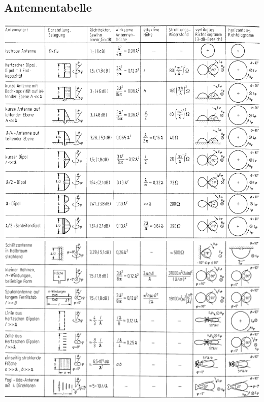 \newpage
\subsection{Antennentabelle}
\begin{minipage}{1.7\columnwidth}
    \includegraphics[width=.55\columnwidth]{Figures/Antennentabelle_1.png}\\
    \includegraphics[width=.55\columnwidth]{Figures/Antennentabelle_2.png}
\end{minipage}